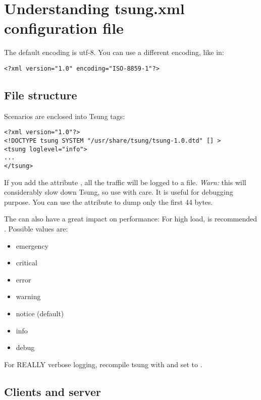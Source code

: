 \documentclass{IDXDOC-en}
\begin{document}
\section{Understanding tsung.xml configuration file}

The default encoding is utf-8.  You can use a different encoding, like in:

 \begin{Verbatim}
<?xml version="1.0" encoding="ISO-8859-1"?>
 \end{Verbatim}

\subsection{File structure}

 Scenarios are enclosed into Tsung tags:

 \begin{Verbatim}
<?xml version="1.0"?>
<!DOCTYPE tsung SYSTEM "/usr/share/tsung/tsung-1.0.dtd" [] >
<tsung loglevel="info">
...
</tsung>
 \end{Verbatim}

 If you add the attribute , all the
 traffic will be logged to a file. \emph{Warn:} this will considerably
 slow down Tsung, so use with care. It is useful for debugging
 purpose. You can use the attribute  to
 dump only the first 44 bytes.

 The  can also have a great impact on performance:
 For high load,  is recommended .
 Possible values are:

\begin{itemize}
\item emergency
\item critical
\item error
\item warning
\item notice (default)
\item info
\item debug
\end{itemize}

For REALLY verbose logging, recompile tsung with 
and set  to .

\subsection{Clients and server}
\end{document}
